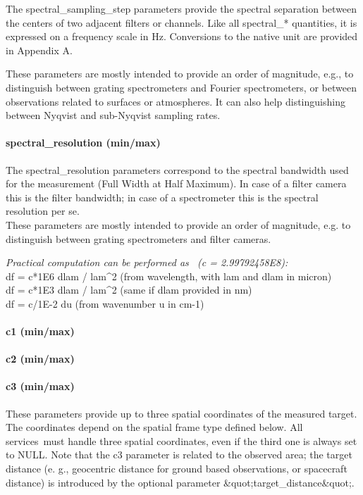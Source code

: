 \documentclass[11pt,a4paper]{ivoa}
\begin{document}
The spectral\_sampling\_step parameters provide the spectral separation between the centers of two adjacent filters or channels. Like all spectral\_* quantities, it is expressed on a frequency scale in Hz. Conversions to the native unit are provided in Appendix A. 

These parameters are mostly intended to provide an order of magnitude, e.g., to distinguish between grating spectrometers and Fourier spectrometers, or between observations related to surfaces or atmospheres. It can also help distinguishing between Nyqvist and sub-Nyqvist sampling rates.

\paragraph{spectral\_resolution (min/max)}

The spectral\_resolution parameters correspond to the spectral bandwidth used for the measurement (Full Width at Half Maximum). In case of a filter camera this is the filter bandwidth; in case of a spectrometer this is the spectral resolution per se. \\ These parameters are mostly intended to provide an order of magnitude, e.g. to distinguish between grating spectrometers and filter cameras.

\emph{Practical computation can be performed as  (c = 2.99792458E8):}\\df = c*1E6 dlam / lam^2 (from wavelength, with lam and dlam in micron)\\df = c*1E3 dlam / lam^2 (same if dlam provided in nm)\\df = c/1E-2 du (from wavenumber u in cm-1)

\paragraph{c1 (min/max)}

\paragraph{c2 (min/max)}

\paragraph{c3 (min/max)}

These parameters provide up to three spatial coordinates of the measured target. The coordinates depend on the spatial frame type defined below. All services must handle three spatial coordinates, even if the third one is always set to NULL. Note that the c3 parameter is related to the observed area; the target distance (e. g., geocentric distance for ground based observations, or spacecraft distance) is introduced by the optional parameter \&quot;target\_distance\&quot;.
\end{document}
